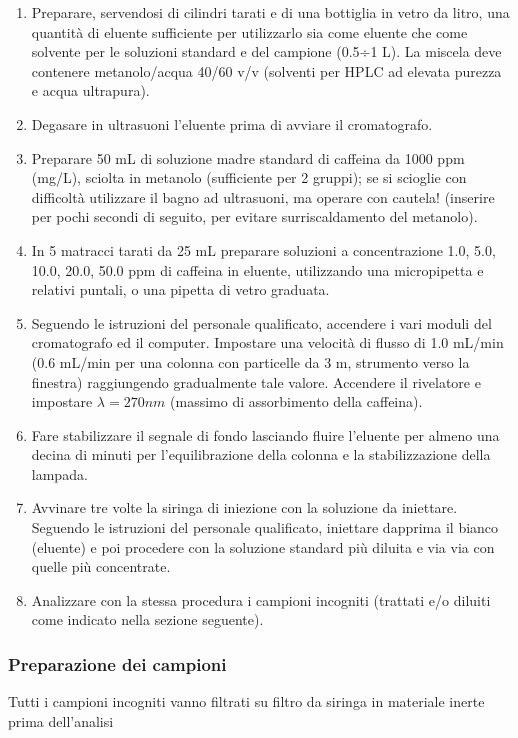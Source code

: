 \begin{enumerate}
\item Preparare, servendosi di cilindri tarati e di una bottiglia in vetro da litro, una quantità di eluente sufficiente per utilizzarlo sia come eluente che come solvente per le soluzioni standard e del campione (0.5÷1 L). La miscela deve contenere metanolo/acqua 40/60 v/v (solventi per HPLC ad elevata purezza e acqua ultrapura).
\item Degasare in ultrasuoni l'eluente prima di avviare il cromatografo.
\item Preparare 50 mL di soluzione madre standard di caffeina da 1000 ppm (mg/L), sciolta in metanolo (sufficiente per 2 gruppi); se si scioglie con difficoltà utilizzare il bagno ad ultrasuoni, ma operare con cautela! (inserire per pochi secondi di seguito, per evitare surriscaldamento del metanolo).
\item In 5 matracci tarati da 25 mL preparare soluzioni a concentrazione 1.0, 5.0, 10.0, 20.0, 50.0 ppm di caffeina in eluente, utilizzando una micropipetta e relativi puntali, o una pipetta di vetro graduata.
\item Seguendo le istruzioni del personale qualificato, accendere i vari moduli del cromatografo ed il computer. Impostare una velocità di flusso di 1.0 mL/min (0.6 mL/min per una colonna con particelle da 3 \mu m, strumento verso la finestra) raggiungendo gradualmente tale valore. Accendere il rivelatore e impostare $\lambda = 270 nm$ (massimo di assorbimento della caffeina).
\item Fare stabilizzare il segnale di fondo lasciando fluire l'eluente per almeno una decina di minuti per l'equilibrazione della colonna e la stabilizzazione della lampada.
\item Avvinare tre volte la siringa di iniezione con la soluzione da iniettare. Seguendo le istruzioni del personale qualificato, iniettare dapprima il bianco (eluente) e poi procedere con la soluzione standard più diluita e via via con quelle più concentrate.
\item Analizzare con la stessa procedura i campioni incogniti (trattati e/o diluiti come indicato nella sezione seguente).
\end{enumerate}


\subsubsection{Preparazione dei campioni}

Tutti i campioni incogniti vanno filtrati su filtro da siringa in materiale inerte prima dell'analisi

